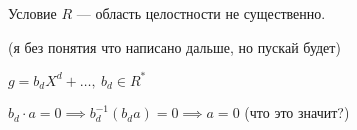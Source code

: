 \begin{notice}
    Условие $R$ --- область целостности не существенно.

    (я без понятия что написано дальше, но пускай будет)

    $g = b_d X^d + \ldots,~b_d \in R^*$

    $b_d \cdot a = 0 \implies b_d^{-1}(b_d a) = 0 \implies a = 0$ (что это значит?)
\end{notice}
